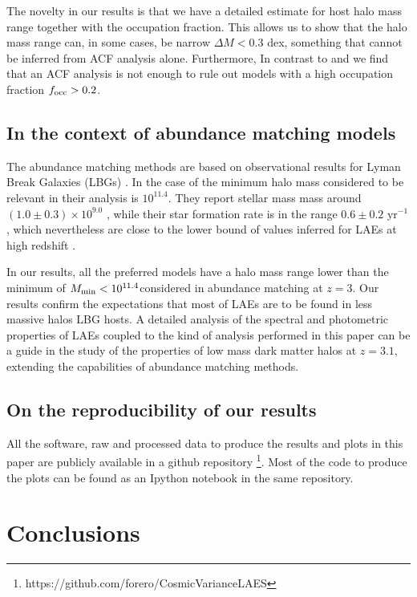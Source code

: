 \documentclass{emulateapj}
\newcommand{\hMsun}{{\ifmmode{h^{-1}{\rm
        {M_{\odot}}}}\else{$h^{-1}{\rm{M_{\odot}}}$}\fi}}
\newcommand{\Msun}{{\ifmmode{{\rm {M_{\odot}}}}\else{${\rm{M_{\odot}}}$}\fi}}
\begin{document}
The novelty in our results is that we have a detailed estimate for 
host halo mass range together with the occupation fraction. This allows us
to show that the halo mass range can, in some cases, be narrow $\Delta M <
0.3$ dex, something that cannot be inferred from ACF analysis alone.
Furthermore, In contrast to \cite{Gawiser07} and \cite{Ouchi2010} we
find that an ACF analysis is not enough to rule
out models with a high occupation fraction $f_{\rm occ}>0.2$.

\subsection{In the context of abundance matching models}

The abundance matching methods are based on observational results for
Lyman Break Galaxies (LBGs) \citep{Behroozi2013a,Behroozi2013b}.  In
the case of \cite{Behroozi2013a} the minimum halo mass considered to
be relevant in their analysis is $10^{11.4}$\hMsun. They report
stellar mass mass around $(1.0\pm0.3)\times 10^{9.0}$ \hMsun, while
their star formation rate is in the range $0.6\pm 0.2$ \Msun yr$^{-1}$,
which nevertheless are close to the lower bound of values inferred for
LAEs at high redshift \citep{Gawiser2007,Nilsson2009,Pentericci2009}. 

In our results, all the preferred models have a halo mass range lower
than the minimum of $M_{\rm min}<10^{11.4}$\hMsun considered in
abundance matching at $z=3$. Our results confirm the expectations
that most of  LAEs are to be found in less massive halos LBG hosts. A
detailed analysis of the spectral and photometric properties of LAEs
coupled to the kind of analysis performed in this paper can be a guide
in the study of the properties of low mass dark matter halos at
$z=3.1$, extending the capabilities of abundance matching methods.

\subsection{On the reproducibility of our results}

All the software, raw and processed data to produce the results
and plots in this paper are publicly available in a github
repository \footnote{https://github.com/forero/CosmicVarianceLAES}. Most
of the code to produce the plots can be found as an Ipython notebook
\citep{IPython} in the same repository.



\section{Conclusions}
\label{sec:conclusions}
\end{document}
